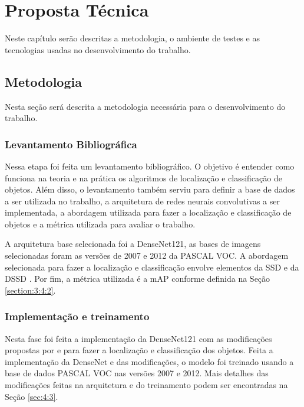 \chapter{Proposta Técnica}
\label{cap:4}
\vspace{-1.9cm}

Neste capítulo serão descritas a metodologia, o ambiente de testes e as tecnologias usadas no desenvolvimento do trabalho.

\section{Metodologia}
\label{sec:4:1}

Nesta seção será descrita a metodologia necessária para o desenvolvimento do trabalho.

\subsection{Levantamento Bibliográfica}
\label{sec:4:1:1}

Nessa etapa foi feita um levantamento bibliográfico. O objetivo é entender como funciona na teoria e na prática os algoritmos de localização e classificação de objetos. Além disso, o levantamento também serviu para definir a base de dados a ser utilizada no trabalho, a arquitetura de redes neurais convolutivas a ser implementada, a abordagem utilizada para fazer a localização e classificação de objetos e a métrica utilizada para avaliar o trabalho.

A arquitetura base selecionada foi a \ac{DenseNet}121, as bases de imagens selecionadas foram as versões de 2007 e 2012 da \ac{PASCAL VOC}. A abordagem selecionada para fazer a localização e classificação envolve elementos da \ac{SSD} \cite{wei-2015} e da \ac{DSSD} \cite{cheng-2017}. Por fim, a métrica utilizada é a \ac{mAP} conforme definida na Seção \ref{section:3:4:2}.

\subsection{Implementação e treinamento}
\label{sec:4:1:2}

Nesta fase foi feita a implementação da \ac{DenseNet}121 com as modificações propostas por  e  para fazer a localização e classificação dos objetos. Feita a implementação da \ac{DenseNet} e das modificações, o modelo foi treinado usando a base de dados \ac{PASCAL VOC} nas versões 2007 e 2012. Mais detalhes das modificações feitas na arquitetura e do treinamento podem ser encontradas na Seção \ref{sec:4:3}.

